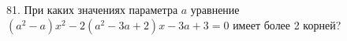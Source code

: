 81. При каких значениях параметра $a$ уравнение $(a^2-a)x^2-2(a^2-3a+2)x-3a+3=0$ имеет более 2 корней?\\
